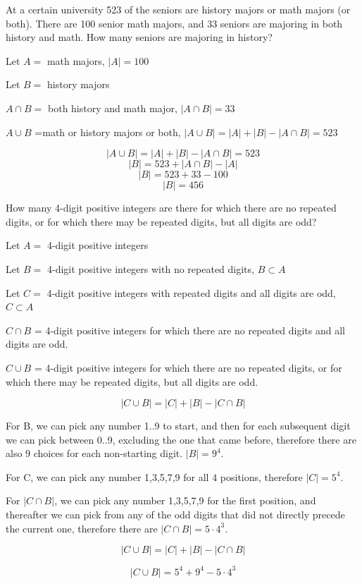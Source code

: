 \documentclass[openany, 12pt]{book}
\begin{document}
\begin{exercise}{}
	At a certain university 523 of the seniors are history
	majors or math majors (or both). There are 100 senior math majors, and 33
	seniors are majoring in both history and math. How many seniors are majoring in
	history?
	\begin{alist}
		\item Let $A=$ math majors, $|A|=100$
		\item Let $B=$ history majors
		\item $A\cap B=$ both history and math major, $|A\cap B|=33$
		\item $A \cup B$ =math or history majors or both, $|A\cup B|=|A| +
			|B| - |A\cap B|=523$
		\item
		$$|A\cup B|=|A| + |B| - |A\cap B|=523$$
		$$|B| = 523 + |A\cap B| - |A|$$
		$$|B| = 523 + 33 - 100$$
		$$|B| = 456$$
	\end{alist}
\end{exercise}

\begin{exercise}{}{}
	How many 4-digit positive integers are there for which
	there are no repeated digits, or for which there may be repeated digits, but
	all digits are odd?
	\begin{alist}
		\item Let $A=$ 4-digit positive integers
		\item Let $B=$ 4-digit positive integers with no repeated digits, $B \subset
			A$
		\item Let $C=$ 4-digit positive integers with repeated digits and all digits
		are odd, $C \subset A$
		\item $C\cap B$  = 4-digit positive integers for which there are
		no repeated digits and all digits are odd.
		\item $C\cup B$  = 4-digit positive integers for which there are
		no repeated digits, or for which there may be repeated digits, but all
		digits are odd.
		\item
		$$|C\cup B| = |C| + |B| - |C\cap B|$$
		\item For B, we can pick any number 1..9 to start, and then for each
		subsequent digit we can pick between 0..9, excluding the one that came
		before, therefore there are also 9 choices for each non-starting digit.
		$|B| = 9^4$.
		\item For C, we can pick any number 1,3,5,7,9 for all 4 positions, therefore
		$|C|=5^4$.
		\item For $|C\cap B|$, we can pick any number 1,3,5,7,9 for the first
		position, and thereafter we can pick from any of the odd digits that did
		not directly precede the current one, therefore there are $|C \cap
			B|=5\cdot4^3$.
		\item $$|C\cup B| = |C| + |B| - |C\cap B|$$
		\item $$|C\cup B| = 5^4+9^4-5\cdot 4^3$$
	\end{alist}
\end{exercise}
\end{document}
